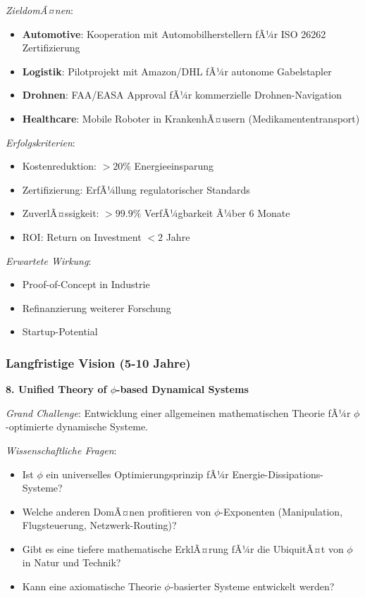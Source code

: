 ﻿\documentclass[a4paper,12pt]{article}
\theoremstyle{definition}
\begin{document}
\textit{ZieldomÃ¤nen}:
\begin{itemize}
	\item \textbf{Automotive}: Kooperation mit Automobilherstellern fÃ¼r ISO 26262 Zertifizierung
	\item \textbf{Logistik}: Pilotprojekt mit Amazon/DHL fÃ¼r autonome Gabelstapler
	\item \textbf{Drohnen}: FAA/EASA Approval fÃ¼r kommerzielle Drohnen-Navigation
	\item \textbf{Healthcare}: Mobile Roboter in KrankenhÃ¤usern (Medikamententransport)
\end{itemize}

\textit{Erfolgskriterien}:
\begin{itemize}
	\item Kostenreduktion: $> 20\%$ Energieeinsparung
	\item Zertifizierung: ErfÃ¼llung regulatorischer Standards
	\item ZuverlÃ¤ssigkeit: $> 99.9\%$ VerfÃ¼gbarkeit Ã¼ber 6 Monate
	\item ROI: Return on Investment $< 2$ Jahre
\end{itemize}

\textit{Erwartete Wirkung}:
\begin{itemize}
	\item Proof-of-Concept in Industrie
	\item Refinanzierung weiterer Forschung
	\item Startup-Potential
\end{itemize}

\subsubsection{Langfristige Vision (5-10 Jahre)}

\textbf{8. Unified Theory of $\phi$-based Dynamical Systems}

\textit{Grand Challenge}: Entwicklung einer allgemeinen mathematischen Theorie fÃ¼r $\phi$-opti\-mierte dynamische Systeme.

\textit{Wissenschaftliche Fragen}:
\begin{itemize}
	\item Ist $\phi$ ein universelles Optimierungsprinzip fÃ¼r Energie-Dissipations-Systeme?
	\item Welche anderen DomÃ¤nen profitieren von $\phi$-Exponenten (Manipulation, Flugsteuerung, Netzwerk-Routing)?
	\item Gibt es eine tiefere mathematische ErklÃ¤rung fÃ¼r die UbiquitÃ¤t von $\phi$ in Natur und Technik?
	\item Kann eine axiomatische Theorie $\phi$-basierter Systeme entwickelt werden?
\end{itemize}
\end{document}
